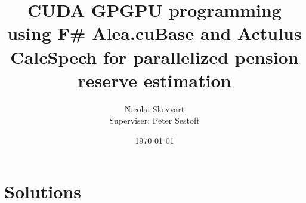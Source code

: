 \documentclass{llncs}
\title{CUDA GPGPU programming using F\# Alea.cuBase and Actulus CalcSpech for parallelized pension reserve estimation}
\author{Nicolai Skovvart \email{nbsk@itu.dk}\\Superviser: Peter Sestoft}
\date{\today}
\institute{IT University of Copenhagen}
\begin{document}
	
	
	\setcounter{page}{1}
	
	\maketitle

	

	\tableofcontents
	\listoffigures

	\clearpage	

	
	

	\section{Solutions}
	
	
	

	
	
	
	
	
	
	
    \clearpage
	\appendix
	\addappheadtotoc
	
\end{document}
